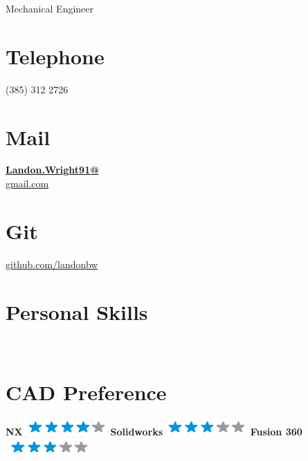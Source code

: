 \documentclass[]{friggeri-cv}
\begin{document}
      {Mechanical Engineer}


\begin{aside}
	\vspace{0.65 in}{~}	
  \section{Telephone}
    (385) 312 2726
    ~
  \section{Mail}
    \href{mailto:landon.Wright91+resume@Gmail.com}{\textbf{Landon.Wright91@}\\gmail.com}
    ~
  \section{Git}
    \href{https://github.com/landonbw}{github.com/landonbw}
  \section{Personal Skills}
    ~
    \section{CAD Preference}
    \textbf{NX}\includegraphics[scale=0.40]{img/4stars.png}
    \textbf{Solidworks}\includegraphics[scale=0.40]{img/3stars.png}
    \textbf{Fusion 360}\includegraphics[scale=0.40]{img/3stars.png}
    ~

\end{aside}
\end{document}
